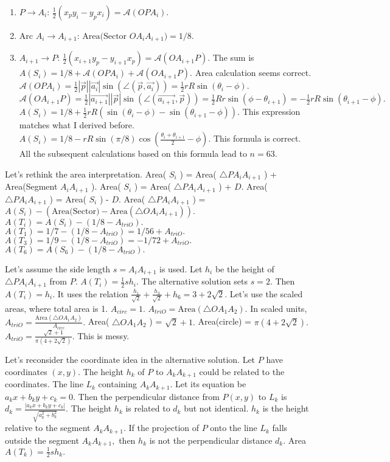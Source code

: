\begin{enumerate}\item $P \to A_i$: $\frac{1}{2}(x_p y_i - y_p x_i) = \mathcal{A}(OPA_i).$\item Arc $A_i \to A_{i+1}$: $\text{Area(Sector } OA_iA_{i+1}) = 1/8.$\item $A_{i+1} \to P$: $\frac{1}{2}(x_{i+1} y_p - y_{i+1} x_p) = \mathcal{A}(OA_{i+1}P).$ 
The sum is $A(S_i) = 1/8 + \mathcal{A}(OPA_i) + \mathcal{A}(OA_{i+1}P).$ 
Area calculation seems correct. 
$\mathcal{A}(OPA_i) = \frac{1}{2} |\vec{p}| |\vec{a_i}| \sin(\angle(\vec{p}, \vec{a_i})) = \frac{1}{2} r R \sin(\theta_i - \phi).$ 
$\mathcal{A}(OA_{i+1}P) = \frac{1}{2} |\vec{a_{i+1}}| |\vec{p}| \sin(\angle(\vec{a_{i+1}}, \vec{p})) = \frac{1}{2} R r \sin(\phi - \theta_{i+1}) = -\frac{1}{2} rR \sin(\theta_{i+1}-\phi).$ 
$A(S_i) = 1/8 + \frac{1}{2} rR (\sin(\theta_i-\phi) - \sin(\theta_{i+1}-\phi)).$ 
This expression matches what I derived before. 
$A(S_i) = 1/8 - rR \sin(\pi/8) \cos(\frac{\theta_i+\theta_{i+1}}{2} - \phi).$ 
This formula is correct. 
All the subsequent calculations based on this formula lead to $n=63.$
\end{enumerate}

Let's rethink the area interpretation. 
Area( $S_i$ ) = Area( $\triangle PA_iA_{i+1}$ ) + Area(Segment $A_iA_{i+1}$ ). 
Area( $S_i$ ) = Area( $\triangle PA_iA_{i+1}$ ) + $D.$ 
Area( $\triangle PA_iA_{i+1}$ ) = Area( $S_i$ ) - $D.$ 
Area( $\triangle PA_iA_{i+1}$ ) = $A(S_i) - (\text{Area(Sector)} - \text{Area}(\triangle OA_iA_{i+1})).$ 
$A(T_i) = A(S_i) - (1/8 - A_{triO}).$ 
$A(T_1) = 1/7 - (1/8 - A_{triO}) = 1/56 + A_{triO}.$ 
$A(T_3) = 1/9 - (1/8 - A_{triO}) = -1/72 + A_{triO}.$ 
$A(T_6) = A(S_6) - (1/8 - A_{triO}).$

Let's assume the side length $s=A_iA_{i+1}$ is used. Let $h_i$ be the height of $\triangle PA_iA_{i+1}$ from $P.$ 
$A(T_i) = \frac{1}{2} s h_i.$ 
The alternative solution sets $s=2.$ Then $A(T_i)=h_i.$ 
It uses the relation $\frac{h_1}{\sqrt{2}} + \frac{h_3}{\sqrt{2}} + h_6 = 3+2\sqrt{2}.$ 
Let's use the scaled areas, where total area is 1. $A_{circ}=1.$ 
$A_{triO} = \text{Area}(\triangle OA_1A_2).$ In scaled units, $A_{triO} = \frac{\text{Area}(\triangle OA_1A_2)}{A_{circ}}.$ 
Area( $\triangle OA_1A_2$ ) = $\sqrt{2}+1.$ Area(circle) = $\pi(4+2\sqrt{2}).$ 
$A_{triO} = \frac{\sqrt{2}+1}{\pi(4+2\sqrt{2})}.$ This is messy.

Let's reconsider the coordinate idea in the alternative solution. 
Let $P$ have coordinates $(x,y).$ The height $h_k$ of $P$ to $A_k A_{k+1}$ could be related to the coordinates. 
The line $L_k$ containing $A_k A_{k+1}.$ Let its equation be $a_k x + b_k y + c_k = 0.$ Then the perpendicular distance from $P(x,y)$ to $L_k$ is $d_k = \frac{|a_k x + b_k y + c_k|}{\sqrt{a_k^2+b_k^2}}.$ 
The height $h_k$ is related to $d_k$ but not identical. $h_k$ is the height relative to the segment $A_k A_{k+1}.$ If the projection of $P$ onto the line $L_k$ falls outside the segment $A_k A_{k+1},$ then $h_k$ is not the perpendicular distance $d_k.$ 
Area $A(T_k) = \frac{1}{2} s h_k.$

